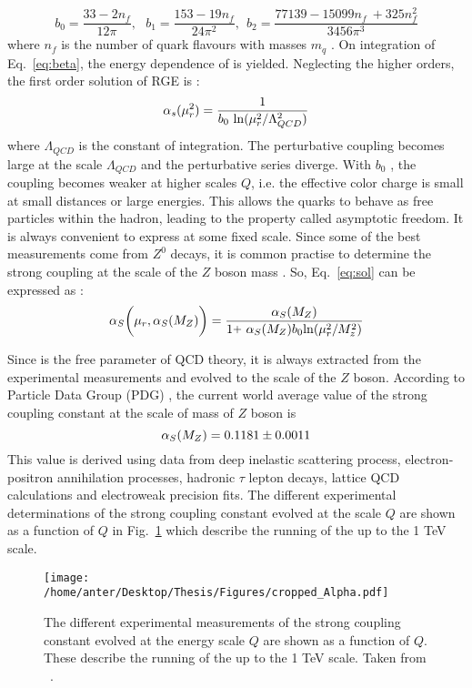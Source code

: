 \begin{equation}
b_0 = \frac{33-2n_f}{12\pi}, ~~~b_1 = \frac{153-19n_f}{24\pi^2}, ~~b_2 = \frac{77139 - 15099n_f~\plus 325n^2_f}{3456\pi^3}
\end{equation}
where $n_f$ is the number of quark flavours with masses $m_q$ \ls \mur. On integration of Eq.~\ref{eq:beta}, the energy dependence of \alps is yielded. Neglecting the higher orders, the first order solution of RGE is :
\begin{equation}
\alpha_{s}(\mur^2)=\frac{1}{b_0~{\rm ln}(\mur^2/\Lambda^2_{QCD})}
\label{eq:sol}
\end{equation}
where $\Lambda_{QCD}$ is the constant of integration. The perturbative coupling becomes large at the scale $\Lambda_{QCD}$ and the perturbative series diverge. With $b_0$ , the coupling becomes weaker at higher scales $Q$, i.e. the effective color charge is small at small distances or large energies. This allows the quarks to behave as free particles within the hadron, leading to the property called asymptotic freedom. It is always convenient to express \alps at some fixed scale. Since some of the best measurements come from $Z^0$ decays, it is common practise to determine the strong coupling at the scale of the $Z$ boson mass \alpsmz. So, Eq.~\ref{eq:sol} can be expressed as :
\begin{equation}
\alps\bigg(\mur,\alpsmz\bigg) = \frac{\alpsmz}{1\plus\alpsmz b_0{\rm ln}(\mur^2/M^2_z)}
\end{equation}

Since \alps is the free parameter of QCD theory, it is always extracted from the experimental measurements and evolved to the scale of the $Z$ boson. According to Particle Data Group (PDG) \cite{Patrignani:2016xqp}, the current world average value of the strong coupling constant at the scale of mass of $Z$ boson is 
\begin{equation}
\alpha_S(M_Z) = 0.1181 \pm 0.0011
\end{equation}
This value is derived using data from deep inelastic scattering process, electron-positron annihilation processes, hadronic $\tau$ lepton decays, lattice QCD calculations and electroweak precision fits. The different experimental determinations of the strong coupling constant evolved at the scale $Q$ are shown as a function of $Q$ in Fig.~\ref{fig:alpha_pdg} which describe the running of the \alps up to the 1 TeV scale.
\vspace*{2mm}
\begin{figure}[!h]
\begin{center}
\hspace*{-7mm}
\texttt{[image: /home/anter/Desktop/Thesis/Figures/cropped\_Alpha.pdf]}\\
\vspace*{4mm}
\caption[Running of the strong coupling constant.]{The different experimental measurements of the strong coupling constant \alps evolved at the energy scale $Q$ are shown as a function of $Q$. These describe the running of the \alps up to the 1 TeV scale. Taken from ~\cite{Patrignani:2016xqp}.}
\label{fig:alpha_pdg}
\end{center}
\end{figure}

